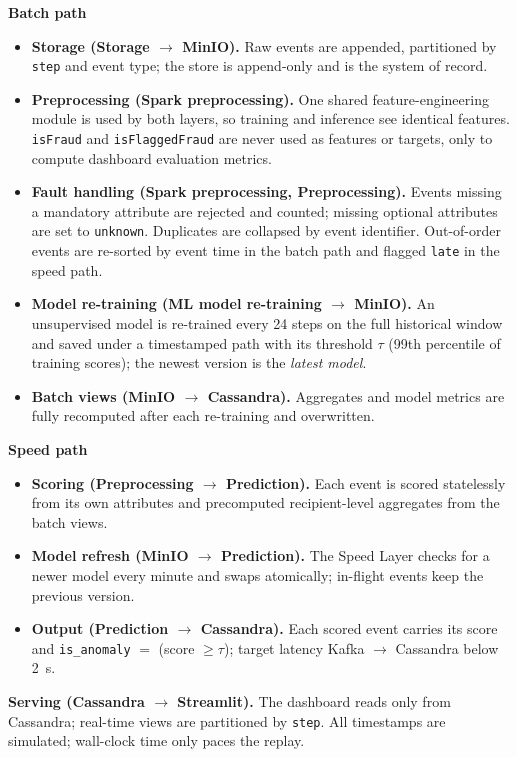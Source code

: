 \documentclass[titlepage]{article}
\begin{document}
\noindent \textbf{Batch path}
\begin{itemize}
    \item \textbf{Storage (Storage $\rightarrow$ MinIO).} Raw events are appended, partitioned by \texttt{step} and event type; the store is append-only and is the system of record.
    \item \textbf{Preprocessing (Spark preprocessing).} One shared feature-engineering module is used by both layers, so training and inference see identical features. \texttt{isFraud} and \texttt{isFlaggedFraud} are never used as features or targets, only to compute dashboard evaluation metrics.
    \item \textbf{Fault handling (Spark preprocessing, Preprocessing).} Events missing a mandatory attribute are rejected and counted; missing optional attributes are set to \texttt{unknown}. Duplicates are collapsed by event identifier. Out-of-order events are re-sorted by event time in the batch path and flagged \texttt{late} in the speed path.
    \item \textbf{Model re-training (ML model re-training $\rightarrow$ MinIO).} An unsupervised model is re-trained every 24 steps on the full historical window and saved under a timestamped path with its threshold $\tau$ (99th percentile of training scores); the newest version is the \emph{latest model}.
    \item \textbf{Batch views (MinIO $\rightarrow$ Cassandra).} Aggregates and model metrics are fully recomputed after each re-training and overwritten.
\end{itemize}

\noindent \textbf{Speed path}
\begin{itemize}
    \item \textbf{Scoring (Preprocessing $\rightarrow$ Prediction).} Each event is scored statelessly from its own attributes and precomputed recipient-level aggregates from the batch views.
    \item \textbf{Model refresh (MinIO $\rightarrow$ Prediction).} The Speed Layer checks for a newer model every minute and swaps atomically; in-flight events keep the previous version.
    \item \textbf{Output (Prediction $\rightarrow$ Cassandra).} Each scored event carries its score and \texttt{is\_anomaly} $=$ (score $\ge \tau$); target latency Kafka $\rightarrow$ Cassandra below 2~s.
\end{itemize}

\noindent \textbf{Serving (Cassandra $\rightarrow$ Streamlit).} The dashboard reads only from Cassandra; real-time views are partitioned by \texttt{step}. All timestamps are simulated; wall-clock time only paces the replay.
\end{document}
